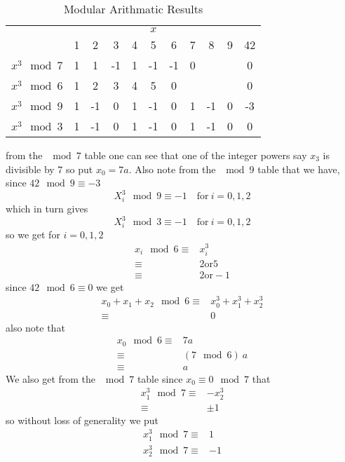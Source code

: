 \documentclass[a4paper,oneside,english]{article}
\numberwithin{equation}{section}
\numberwithin{figure}{section}
\numberwithin{table}{section}
\begin{document}
\begin{table}[h]
	\caption{Modular Arithmatic Results}
	\begin{center}
		\begin{tabular}{|c||ccccccccc|c|}\hline
&\multicolumn{9}{c|}{$x$}&\\
 &1&2&3&4&5&6&7&8&9&42\\
\hline \hline
$x^3 \mod 7$& 1&1&-1&1&-1&-1&0&&&0 \\
$x^3 \mod 6$& 1&2&3&4&5&0&&&&0\\
$x^3 \mod 9$& 1&-1&0&1&-1&0&1&-1&0&-3\\
$x^3 \mod 3$& 1&-1&0&1&-1&0&1&-1&0&0\\
\hline	
\end{tabular}
	\end{center}
\end{table}
from the $\mod 7$ table one can see that one of the integer powers say $x_3$ is divisible by 7 so put $x_0 =7a$. Also note from the $\mod 9$ table that we have, since $42 \mod 9 \equiv -3$
\begin{equation}\label{m9}
X_i^3 \mod 9 \equiv -1\quad  \mathrm{for}\:  i= 0,1,2
\end{equation}  
 which in turn gives 
\begin{equation}\label{m3}
X_i^3 \mod 3 \equiv -1 \quad \mathrm{for}\:  i= 0,1,2
\end{equation}
so we get for $i= 0,1,2$
\begin{align}
x_i \mod 6 \equiv & x_i^3  \\
\equiv & 2 \mathrm{or} 5 \\
\equiv & 2 \mathrm{or} -1 \label{m6-options}
\end{align}
since $42 \mod 6 \equiv 0$ we get 
\begin{align}
x_0+x_1+x_2 \mod 6 \equiv & x_0^3+x_1^3+x_2^3 \\
\equiv & 0 \label{sum-m6}
\end{align}
also note that 
\begin{align}
x_0 \mod 6 \equiv & 7a\\
\equiv & (7 \mod 6)\:a\\
\equiv & a \label{a_m6}
\end{align}
We also get from the $\mod 7$ table since $x_0 \equiv 0 \mod 7$ that \begin{align}
x_1^3 \mod 7 \equiv & -x_2^3 \\
\equiv & \pm1
\end{align}
so without loss of generality we put\begin{align}
x_1^3 \mod 7 \equiv & 1 \label{m7-x1}\\ 
x_2^3 \mod 7 \equiv & -1 \label{m7-x2} 
\end{align} 
\end{document}
